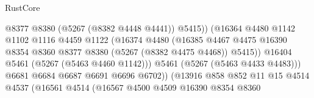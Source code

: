 \begin{lexlean}{RustCore}
\begin{coremodule}
                                                @8377
                                                @8380
                                                (@5267 (@8382 @4448 @4441))
                                                @5415))
                                            (@16364
                                              @4480
                                              @1142
                                              @1102
                                              @1116
                                              @4459
                                              @1122
                                              (@16374
                                                @4480
                                                (@16385
                                                  @4467
                                                  @4475
                                                  @16390
                                                  @8354
                                                  @8360
                                                  @8377
                                                  @8380
                                                  (@5267 (@8382 @4475 @4468))
                                                  @5415))
                                              @16404
                                              @5461
                                              (@5267 (@5463 @4460 @1142)))
                                            @5461
                                            (@5267 (@5463 @4433 @4483)))
                                          @6681
                                          @6684
                                          @6687
                                          @6691
                                          @6696
                                          @6702))
                                      (@13916
                                        @858
                                        @852
                                        @11
                                        @15
                                        @4514
                                        @4537
                                        (@16561
                                          @4514
                                          (@16567
                                            @4500
                                            @4509
                                            @16390
                                            @8354
                                            @8360

\end{coremodule}
\end{lexlean}

